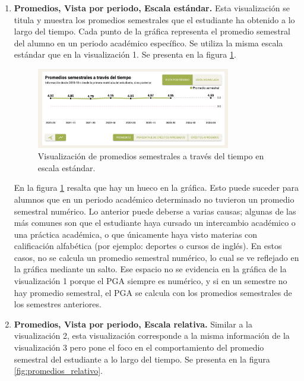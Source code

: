 \begin{enumerate}
	\item \textbf{Promedios, Vista por periodo, Escala estándar.} Esta visualización se titula  y muestra los promedios semestrales que el estudiante ha obtenido a lo largo del tiempo. Cada punto de la gráfica representa el promedio semestral del alumno en un periodo académico específico. Se utiliza la misma escala estándar que en la visualización 1. Se presenta en la figura \ref{fig:promedios_estandar}.

	      \begin{figure}[H]
		      \centering
		      \includegraphics[width=0.8\textwidth]{assets/nes/promedios_estandar.png}
		      \caption{Visualización de promedios semestrales a través del tiempo en escala estándar.}
		      \label{fig:promedios_estandar}
	      \end{figure}

	      En la figura \ref{fig:promedios_estandar} resalta que hay un hueco en la gráfica. Esto puede suceder para alumnos que en un periodo académico determinado no tuvieron un promedio semestral numérico. Lo anterior puede deberse a varias causas; algunas de las más comunes son que el estudiante haya cursado un intercambio académico o una práctica académica, o que únicamente haya visto materias con calificación alfabética (por ejemplo: deportes o cursos de inglés). En estos casos, no se calcula un promedio semestral numérico, lo cual se ve reflejado en la gráfica mediante un salto. Ese espacio no se evidencia en la gráfica de la visualización 1 porque el PGA siempre es numérico, y si en un semestre no hay promedio semestral, el PGA se calcula con los promedios semestrales de los semestres anteriores.

	\item \textbf{Promedios, Vista por periodo, Escala relativa.} Similar a la visualización 2, esta visualización corresponde a la misma información de la visualización 3 pero pone el foco en el comportamiento del promedio semestral del estudiante a lo largo del tiempo. Se presenta en la figura \ref{fig:promedios_relativo}.


\end{enumerate}
